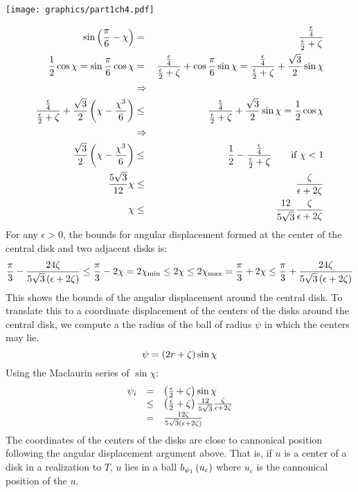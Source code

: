 \begin{minipage}{\linewidth}
\begin{center}
\texttt{[image: graphics/part1ch4.pdf]}
\label{fig:part1ch4.pdf}
\end{center}
\end{minipage}

\begin{eqnarray*}
\sin \left( \frac{\pi}{6} - \chi \right) &=& \frac{\frac{\epsilon}{4}}{\frac{\epsilon}{2}+\zeta}\\
\frac{1}{2}\cos \chi = \sin \frac{\pi}{6} \cos \chi &=& \frac{\frac{\epsilon}{4}}{\frac{\epsilon}{2}+\zeta} + \cos \frac{\pi}{6} \sin \chi = \frac{\frac{\epsilon}{4}}{\frac{\epsilon}{2}+\zeta} +\frac{\sqrt{3}}{2} \sin \chi \\
&\Rightarrow&\\
\frac{\frac{\epsilon}{4}}{\frac{\epsilon}{2}+\zeta}+ \frac{\sqrt{3}}{2} \left(  \chi - \frac{\chi^3}{6} \right) &\leq& \frac{\frac{\epsilon}{4}}{\frac{\epsilon}{2}+\zeta} + \frac{\sqrt{3}}{2} \sin \chi =\frac{1}{2} \cos \chi\\
&\Rightarrow&\\
\frac{\sqrt{3}}{2} \left(  \chi - \frac{\chi^3}{6} \right)&\leq& \frac{1}{2}-\frac{\frac{\epsilon}{4}}{\frac{\epsilon}{2}+\zeta}  \qquad \text{if }\chi < 1 \\
\frac{5\sqrt{3}}{12} \chi &\leq& \frac{  \zeta }{ \epsilon + 2\zeta } \\
\chi&\leq& \frac{12}{5\sqrt{3}}\frac{ \zeta }{ \epsilon + 2\zeta } 
\end{eqnarray*}
For any $\epsilon > 0$, the bounds for angular displacement formed at the center of the central disk and two adjacent disks is:
$$ \frac{\pi}{3} - \frac{24 \zeta}{5\sqrt{3}\left( \epsilon + 2\zeta \right)} \leq \frac{\pi}{3} - 2 \chi = 2\chi_\text{min} \leq 2\chi \leq 2\chi_\text{max} = \frac{\pi}{3} + 2 \chi \leq \frac{\pi}{3} + \frac{24 \zeta}{5\sqrt{3}\left( \epsilon + 2\zeta \right)}$$
This shows the bounds of the angular displacement around the central disk.  
To translate this to a coordinate displacement of the centers of the disks around the central disk, we compute a the radius of the ball of radius $\psi$ in which the centers may lie. 
$$\psi = \left( 2 r + \zeta \right) \sin \chi$$
Using the Maclaurin series of $\sin \chi$:
$$
\begin{array}{rcl}
\psi_i &=& \left(  \frac{\epsilon}{2} + \zeta \right) \sin \chi\\
&\leq& \left(  \frac{\epsilon}{2} + \zeta \right) \frac{12}{5 \sqrt{3}}\frac{  \zeta }{ \epsilon + 2\zeta } \\
&=& \frac{12\zeta}{5 \sqrt{3}\left(  \epsilon + 2\zeta  \right)}
\end{array}
$$
The coordinates of the centers of the disks are close to cannonical position following the angular displacement argument above.  
That is, if $u$ is a center of a disk in a realization to $T$, $u$ lies in a ball $b_{\psi_1}\left( u_c \right)$ where $u_c$ is the cannonical position of the $u$.  

